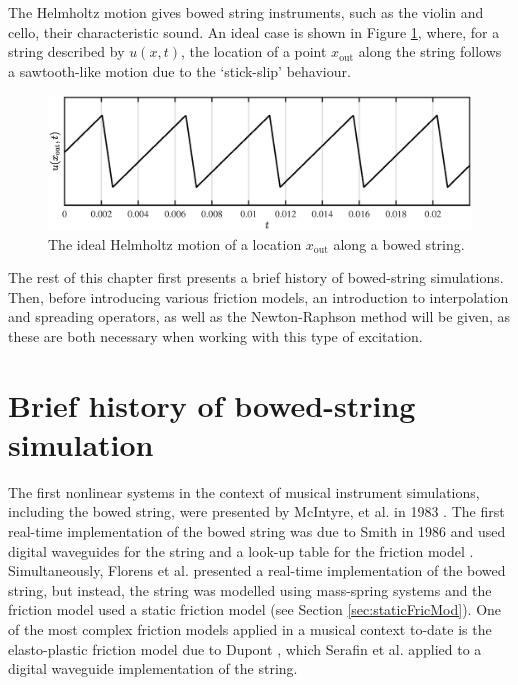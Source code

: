 The Helmholtz motion gives bowed string instruments, such as the violin and cello, their characteristic sound. An ideal case is shown in Figure \ref{fig:helmholtzTimedomain}, where, for a string described by $u(x,t)$, the location of a point $x_\text{out}$ along the string follows a sawtooth-like motion due to the `stick-slip' behaviour. 
\begin{figure}[h]
    \centering
    \includegraphics[width=\textwidth]{figures/exciters/helmholtzTimedomain.eps}
    \caption{The ideal Helmholtz motion of a location $x_\text{out}$ along a bowed string. \label{fig:helmholtzTimedomain}}
\end{figure}

The rest of this chapter first presents a brief history of bowed-string simulations. Then, before introducing various friction models, an introduction to interpolation and spreading operators, as well as the Newton-Raphson method will be given, as these are both necessary when working with this type of excitation.

\section{Brief history of bowed-string simulation}
The first nonlinear systems in the context of musical instrument simulations, including the bowed string, were presented by McIntyre, et al. in 1983 \cite{McIntyre1983}. The first real-time implementation of the bowed string was due to Smith in 1986 and used digital waveguides for the string and a look-up table for the friction model \cite{Smith1986}. Simultaneously, Florens et al. presented a real-time implementation of the bowed string, but instead, the string was modelled using mass-spring systems and the friction model used a static friction model \cite{Florens1986} (see Section \ref{sec:staticFricMod}). One of the most complex friction models applied in a musical context to-date is the elasto-plastic friction model due to Dupont \cite{Dupont2002}, which Serafin et al. \cite{Serafin2003, Serafin2004} applied to a digital waveguide implementation of the string. 

